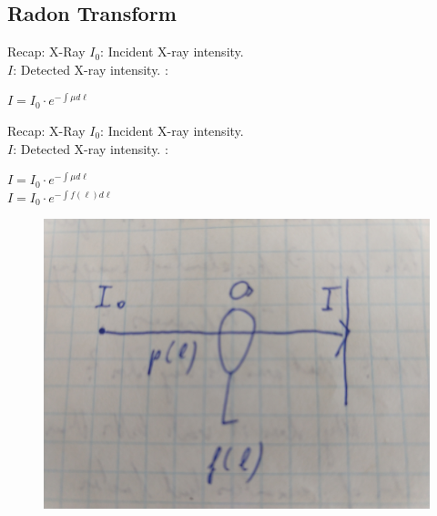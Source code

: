 \subsection{Radon Transform}%
\label{sub:ct_radon}

\begin{frame}{Recap: X-Ray}
    $I_0$: Incident X-ray intensity. \\
    $I$: Detected X-ray intensity.
    \vskip12pt
    :\\
    \begin{center}
     \vskip6pt
        $I=I_0\cdot e^{-\int \mu d\ell}$\\

   \end{center}

 \end{frame}
    
 \begin{frame}{Recap: X-Ray}
    $I_0$: Incident X-ray intensity. \\
    $I$: Detected X-ray intensity.
    \vskip12pt
    :\\
    \begin{center}
     \vskip6pt
        $I=I_0\cdot e^{-\int \mu d\ell}$\\
        \vskip6pt
        $I=I_0\cdot e^{-\int f(\ell) d\ell}$\\
    \end{center}

	\begin{figure}[tbp]
		\centering
		\includegraphics[height=0.3\textheight]{images/x_ray_sketch}
		\label{fig:x_ray_sketch}
	\end{figure}
 \end{frame}

